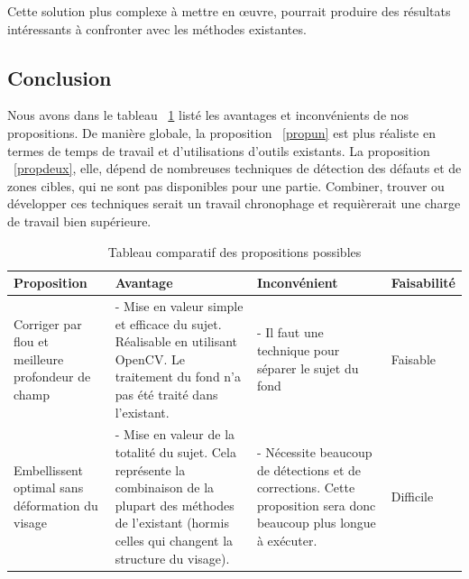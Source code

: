 \documentclass[11pt, french]{report-rd-info}
\begin{document}
Cette solution plus complexe à mettre en œuvre, pourrait produire des résultats intéressants à confronter avec les méthodes existantes.

\subsection{Conclusion}
Nous avons dans le tableau ~\ref{tab:compprop} listé les avantages et inconvénients de nos propositions. De manière globale, la proposition ~\ref{propun} est plus réaliste en termes de temps de travail et d’utilisations d’outils existants. La proposition ~\ref{propdeux}, elle, dépend de nombreuses techniques de détection des défauts et de zones cibles, qui ne sont pas disponibles pour une partie. Combiner, trouver ou développer ces techniques serait un travail chronophage et requièrerait une charge de travail bien supérieure. 




\begin{table}
\begin{center}
\begin{tabular}{|p{3cm}|p{4cm}|p{4cm}|p{4cm}|}
\hline
Proposition & Avantage & Inconvénient & Faisabilité \\ \hline
Corriger par flou et meilleure profondeur de champ & - Mise en valeur simple et efficace du sujet. Réalisable en utilisant OpenCV. Le traitement du fond n'a pas été traité dans l'existant. & - Il faut une technique pour séparer le sujet du fond & Faisable \\ \hline
Embellissent optimal sans déformation du visage & - Mise en valeur de la totalité du sujet. Cela représente la combinaison de la plupart des méthodes de l'existant (hormis celles qui changent la structure du visage). & - Nécessite beaucoup de détections et de corrections. Cette proposition sera donc beaucoup plus longue à exécuter. & Difficile \\ \hline
\end{tabular}
\end{center}
\caption{Tableau comparatif des propositions possibles}
\label{tab:compprop}
\end{table}




\listoffigures{}

\listoftables{}

\appendix
\end{document}
